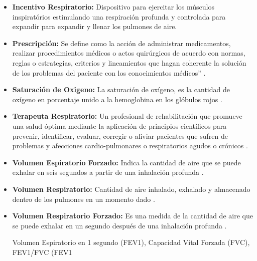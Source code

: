 \documentclass[12pt]{article}
\begin{document}
\begin{itemize}
\item \textbf{Incentivo Respiratorio:} Dispositivo para ejercitar los músculos inspiratórios estimulando una respiración profunda y controlada para expandir para expandir y llenar los pulmones de aire.


\item \textbf{Prescripción:} Se define como la acción de administrar medicamentos, realizar procedimientos médicos o actos quirúrgicos de acuerdo con normas, reglas o estrategias, criterios y lineamientos que hagan coherente la solución de los problemas del paciente con los conocimientos médicos” \cite{20}.


\item \textbf{Saturación de Oxigeno:} La saturación de oxígeno, es la cantidad de oxígeno en porcentaje unido a la hemoglobina en los glóbulos rojos \cite{3}.

\item \textbf{Terapeuta Respiratorio:} Un profesional de rehabilitación que promueve una salud óptima mediante la aplicación de principios científicos para prevenir, identificar, evaluar, corregir o aliviar pacientes que sufren de problemas y afecciones cardio-pulmonares o respiratorios agudos o crónicos \cite{4}.

\item \textbf{Volumen Espiratorio Forzado:} Indica la cantidad de aire que se puede exhalar en seis segundos a partir de una inhalación profunda \cite{22}.

\item \textbf{Volumen Respiratorio:} Cantidad de aire inhalado, exhalado y almacenado dentro de los pulmones en un momento dado \cite{2}.

\item \textbf{Volumen Respiratorio Forzado:} Es una medida de la cantidad de aire que se puede exhalar en un segundo después de una inhalación profunda \cite{22}.





Volumen Espiratorio en 1 segundo (FEV1), Capacidad Vital Forzada (FVC), FEV1/FVC (FEV1%






\end{itemize}
\newpage
\end{document}
